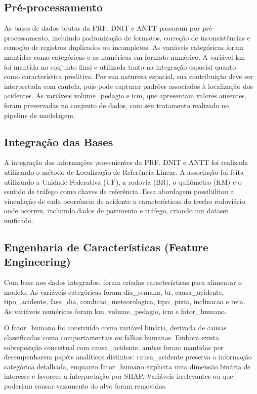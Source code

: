 \documentclass[12pt]{article}
\begin{document}
\subsection{Pré-processamento}
As bases de dados brutas da PRF, DNIT e ANTT passaram por pré-processamento, incluindo padronização de formatos, correção de inconsistências e remoção de registros duplicados ou incompletos. As variáveis categóricas foram mantidas como categóricas e as numéricas em formato numérico. A variável km foi mantida no conjunto final e utilizada tanto na integração espacial quanto como característica preditiva. Por sua natureza espacial, sua contribuição deve ser interpretada com cautela, pois pode capturar padrões associados à localização dos acidentes. As variáveis volume\_pedagio e icm, que apresentam valores ausentes, foram preservadas no conjunto de dados, com seu tratamento realizado no pipeline de modelagem.

\subsection{Integração das Bases}
A integração das informações provenientes da PRF, DNIT e ANTT foi realizada utilizando o método de Localização de Referência Linear. A associação foi feita utilizando a Unidade Federativa (UF), a rodovia (BR), o quilômetro (KM) e o sentido de tráfego como chaves de referência. Essa abordagem possibilitou a vinculação de cada ocorrência de acidente a características do trecho rodoviário onde ocorreu, incluindo dados de pavimento e tráfego, criando um dataset unificado.

\subsection{Engenharia de Características (Feature Engineering)}
Com base nos dados integrados, foram criadas características para alimentar o modelo. As variáveis categóricas foram dia\_semana, br, causa\_acidente, tipo\_acidente, fase\_dia, condicao\_meteorologica, tipo\_pista, inclinacao e reta. As variáveis numéricas foram km, volume\_pedagio, icm e fator\_humano.

O fator\_humano foi construído como variável binária, derivada de causas classificadas como comportamentais ou falhas humanas. Embora exista sobreposição conceitual com causa\_acidente, ambas foram mantidas por desempenharem papéis analíticos distintos: causa\_acidente preserva a informação categórica detalhada, enquanto fator\_humano explicita uma dimensão binária de interesse e favorece a interpretação por SHAP. Variáveis irrelevantes ou que poderiam causar vazamento do alvo foram removidas.
\end{document}
